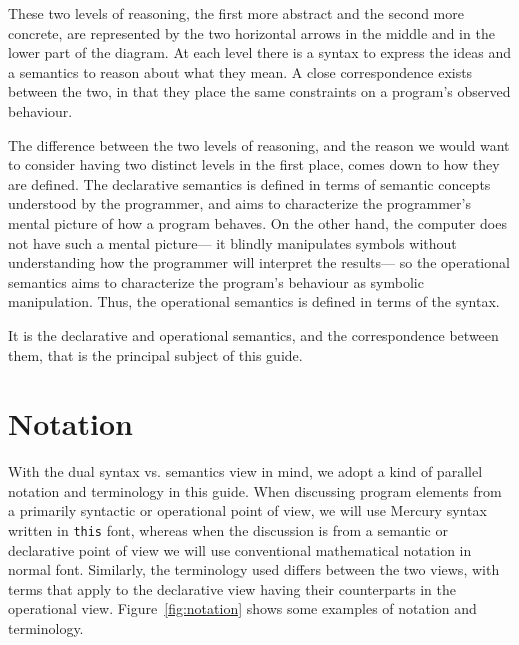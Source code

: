 These two levels of reasoning,
the first more abstract and the second more concrete,
are represented by the two horizontal arrows
in the middle and in the lower part of the diagram.
At each level there is a syntax to express the ideas
and a semantics to reason about what they mean.
A close correspondence exists between the two,
in that they place the same constraints
on a program's observed behaviour.

The difference between the two levels of reasoning,
and the reason we would want to consider
having two distinct levels in the first place,
comes down to how they are defined.
The declarative semantics is defined in terms of semantic concepts
understood by the programmer,
and aims to characterize the programmer's mental picture
of how a program behaves.
On the other hand,
the computer does not have such a mental picture---%
it blindly manipulates symbols
without understanding how the programmer will interpret the results---%
so the operational semantics aims to characterize
the program's behaviour as symbolic manipulation.
Thus, the operational semantics is defined
in terms of the syntax.

It is the declarative and operational semantics,
and the correspondence between them,
that is the principal subject of this guide.


\section{Notation}
\label{sec:notation}

With the dual syntax vs. semantics view in mind,
we adopt a kind of parallel notation and terminology in this guide.
When discussing program elements
from a primarily syntactic or operational point of view,
we will use Mercury syntax written in \verb#this# font,
whereas when the discussion is from a semantic or declarative point of view
we will use conventional mathematical notation in normal font.
Similarly,
the terminology used differs between the two views,
with terms that apply to the declarative view
having their counterparts in the operational view.
Figure~\ref{fig:notation} shows some examples of notation and terminology.

